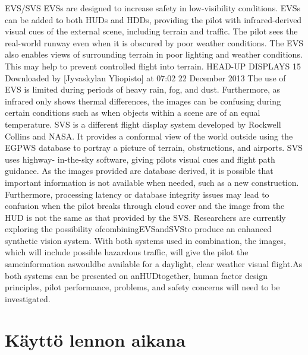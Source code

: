 \documentclass[utf8,bachelor,manualbib]{gradu3}
\begin{document}
EVS/SVS
EVSs are designed to increase safety in low-visibility conditions. EVSs can be
added to both HUDs and HDDs, providing the pilot with infrared-derived visual
cues of the external scene, including terrain and traffic. The pilot sees the
real-world runway even when it is obscured by poor weather conditions. The
EVS also enables views of surrounding terrain in poor lighting and weather conditions.
This may help to prevent controlled flight into terrain.
HEAD-UP DISPLAYS 15
Downloaded by [Jyvaskylan Yliopisto] at 07:02 22 December 2013
The use of EVS is limited during periods of heavy rain, fog, and dust. Furthermore,
as infrared only shows thermal differences, the images can be confusing during
certain conditions such as when objects within a scene are of an equal
temperature.
SVS is a different flight display system developed by Rockwell Collins and
NASA. It provides a conformal view of the world outside using the EGPWS database
to portray a picture of terrain, obstructions, and airports. SVS uses highway-
in-the-sky software, giving pilots visual cues and flight path guidance. As the
images provided are database derived, it is possible that important information is
not available when needed, such as a new construction. Furthermore, processing
latency or database integrity issues may lead to confusion when the pilot breaks
through cloud cover and the image from the HUD is not the same as that provided
by the SVS.
Researchers are currently exploring the possibility ofcombiningEVSandSVSto
produce an enhanced synthetic vision system. With both systems used in combination,
the images, which will include possible hazardous traffic, will give the pilot the
sameinformation aswouldbe available for a daylight, clear weather visual flight.As
both systems can be presented on anHUDtogether, human factor design principles,
pilot performance, problems, and safety concerns will need to be investigated. \citep{crawford2006}

\section{Käyttö lennon aikana}
\end{document}
